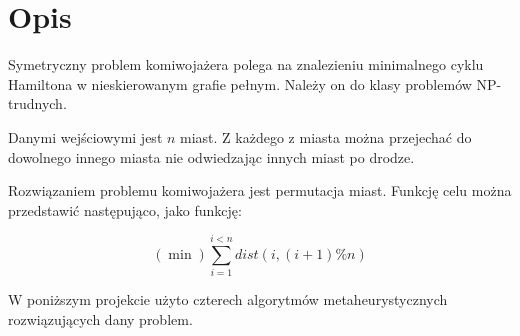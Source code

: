 \section{Opis}

Symetryczny problem komiwojażera polega na znalezieniu minimalnego cyklu Hamiltona
w nieskierowanym grafie pełnym. Należy on do klasy problemów NP-trudnych. 

Danymi wejściowymi jest $ n $ miast. Z każdego z miasta można przejechać do dowolnego
innego miasta nie odwiedzając innych miast po drodze.

Rozwiązaniem problemu komiwojażera jest permutacja miast. Funkcję celu można przedstawić
następująco, jako funkcję:

$$ (\min) \sum_{i=1}^{i < n} dist(i, (i+1) \% n ) $$

W poniższym projekcie użyto czterech algorytmów metaheurystycznych rozwiązujących 
dany problem. 

